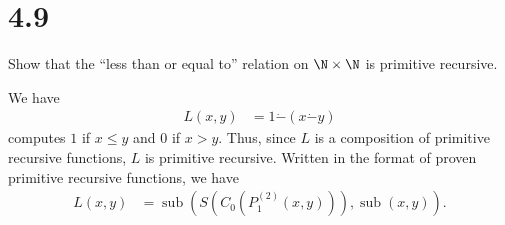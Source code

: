 \documentclass[10pt]{mypackage}
\begin{document}
\section{4.9}%
\begin{problem}
  Show that the ``less than or equal to'' relation on $\N\times \N$ is primitive recursive.
\end{problem}
\begin{solution}
  We have
  \begin{align*}
    L\left(x,y\right) &= 1\dot{-}\left(x\dot{-}y\right)
  \end{align*}
  computes $1$ if $x\leq y$  and $0$ if $x > y$. Thus, since $L$ is a composition of primitive recursive functions, $L$ is primitive recursive. Written in the format of proven primitive recursive functions, we have
  \begin{align*}
    L\left(x,y\right) &= \operatorname{sub}\left(S\left(C_{0}\left(P_{1}^{(2)}\left(x,y\right)\right)\right),\operatorname{sub}\left(x,y\right)\right).
  \end{align*}
\end{solution}
\end{document}
